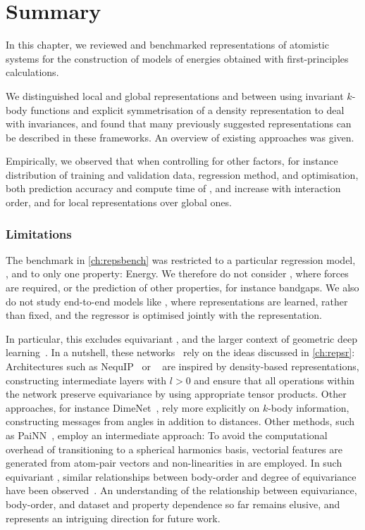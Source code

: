 
\chapter{Summary}
\label{ch:repsdisc}

In this chapter, we reviewed and benchmarked representations of atomistic systems for the construction of \ml models of energies obtained with first-principles calculations. 

We distinguished local and global representations and between using invariant $k$-body functions and explicit symmetrisation of a density representation to deal with invariances, and found that many previously suggested representations can be described in these frameworks. An overview of existing approaches was given.

Empirically, we observed that when controlling for other factors, for instance distribution of training and validation data, regression method, and \hp optimisation, both prediction accuracy and compute time of \sfs, \mbtr and \soap increase with interaction order, and for local representations over global ones.


\subsection{Limitations}

The benchmark in \cref{ch:repsbench} was restricted to a particular regression model, \krr, and to only one property: Energy. We therefore do not consider \mlps, where forces are required, or the prediction of other properties, for instance bandgaps. We also do not study end-to-end models like \nns, where representations are learned, rather than fixed, and the regressor is optimised jointly with the representation.

In particular, this excludes equivariant \nns, and the larger context of geometric deep learning~\cite{bbcv2021a}.
In a nutshell, these networks~\cite{tskr2018q,s2021q} rely on the ideas discussed in \cref{ch:repsr}:
Architectures such as NequIP~\cite{bmsk2022q} or \sok~\cite{fum2022q} are inspired by density-based representations, constructing intermediate layers with $l{>}0$ and ensure that all operations within the network preserve equivariance by using appropriate tensor products.
Other approaches, for instance DimeNet~\cite{kgg2020q}, rely more explicitly on $k$-body information, constructing messages from angles in addition to distances.
Other methods, such as PaiNN~\cite{sug2021q}, employ an intermediate approach: To avoid the computational overhead of transitioning to a spherical harmonics basis, vectorial features are generated from atom-pair vectors and non-linearities in  are employed.
In such equivariant \nns, similar relationships between body-order and degree of equivariance have been observed~\cite{bkoc2022q}. An understanding of the relationship between equivariance, body-order, and dataset and property dependence so far remains elusive, and represents an intriguing direction for future work.



